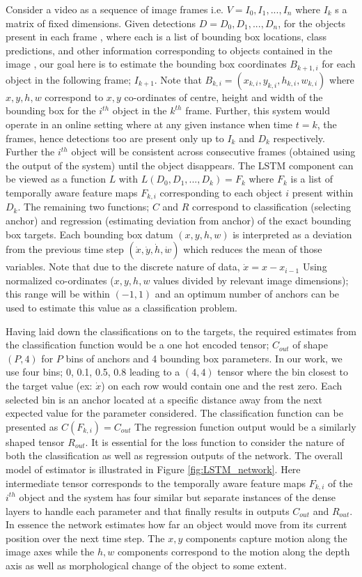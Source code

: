Consider a video as a sequence of image frames i.e. $V = I_{0},I_{1},...,I_{n}$ where $I_{k}$ s a matrix of fixed dimensions. Given detections $D = D_{0},D_{1},...,D_{n}$, for the objects present in each frame , where each  is a list of bounding box locations, class predictions, and other information corresponding to objects contained in the image , our goal here is to estimate the bounding box coordinates $B_{k+1,i}$ for each object in the following frame; $I_{k+1}$. Note that  $B_{k,i} = (x_{k,i},y_{k,i},h_{k,i},w_{k,i})$ where $x,y,h,w$ correspond to $x,y$ co-ordinates of centre, height and width of the bounding box for the $i^{th}$ object in the $k^{th}$ frame. Further, this system would operate in an online setting where at any given instance when time $t = k$, the frames, hence detections too are present only up to $I_{k}$ and $D_{k}$ respectively. Further the $i^{th}$ object will be consistent across consecutive frames (obtained using the output of the system) until the object disappears. The LSTM component can be viewed as a function $L$ with $L(D_{0},D_{1},...,D_{k}) = F_{k}$ where $F_{k}$ is a list of temporally aware feature maps $F_{k,i}$ corresponding to each object $i$ present within $D_{k}$. The remaining two functions; $C$ and $R$ correspond to classification (selecting anchor) and regression (estimating deviation from anchor) of the exact bounding box targets. Each bounding box datum $(x,y,h,w)$ is interpreted as a deviation from the previous time step $(\dot{x},\dot{y},\dot{h},\dot{w})$ which reduces the mean of those variables. Note that due to the discrete nature of data, $\dot{x} = x - x_{i-1}$ Using normalized co-ordinates ($x,y,h,w$ values divided by relevant image dimensions); this range will be within $(-1, 1)$ and an optimum number of anchors can be used to estimate this value as a classification problem. 
\par Having laid down the classifications on to the targets, the required estimates from the classification function would be a one hot encoded tensor; $C_{out}$ of shape $(P, 4)$ for $P$ bins of anchors and 4 bounding box parameters. In our work, we use four bins; 0, 0.1, 0.5, 0.8 leading to a $(4, 4)$ tensor where the bin closest to the target value (ex: $\dot{x}$)  on each row would contain one and the rest zero. Each selected bin is an anchor located at a specific distance away from the next expected value for the parameter considered. The classification function can be presented as $C(F_{k,i}) = C_{out}$ The regression function output would be a similarly shaped tensor $R_{out}$. It is essential for the loss function to consider the nature of both the classification as well as regression outputs of the network. The overall model of estimator is illustrated in Figure \ref{fig:LSTM_network}. Here intermediate tensor corresponds to the temporally aware feature maps $F_{k,i}$ of the $i^{th}$ object and the system has four similar but separate instances of the dense layers to handle each parameter and that finally results in outputs $C_{out}$ and $R_{out}$. In essence the network estimates how far an object would move from its current position over the next time step. The $x,y$ components capture motion along the image axes while the $h,w$ components correspond to the motion along the depth axis as well as morphological change of the object to some extent. 
